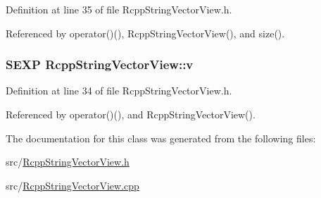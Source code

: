 Definition at line 35 of file RcppStringVectorView.h.

Referenced by operator()(), RcppStringVectorView(), and size().\hypertarget{classRcppStringVectorView_a1db3cc1a2dd1809151351c123343c15e}{
\subsubsection[{v}]{\setlength{\rightskip}{0pt plus 5cm}SEXP {\bf RcppStringVectorView::v}}}
\label{classRcppStringVectorView_a1db3cc1a2dd1809151351c123343c15e}


Definition at line 34 of file RcppStringVectorView.h.

Referenced by operator()(), and RcppStringVectorView().

The documentation for this class was generated from the following files:\begin{DoxyCompactItemize}
\item 
src/\hyperlink{RcppStringVectorView_8h}{RcppStringVectorView.h}\item 
src/\hyperlink{RcppStringVectorView_8cpp}{RcppStringVectorView.cpp}\end{DoxyCompactItemize}

